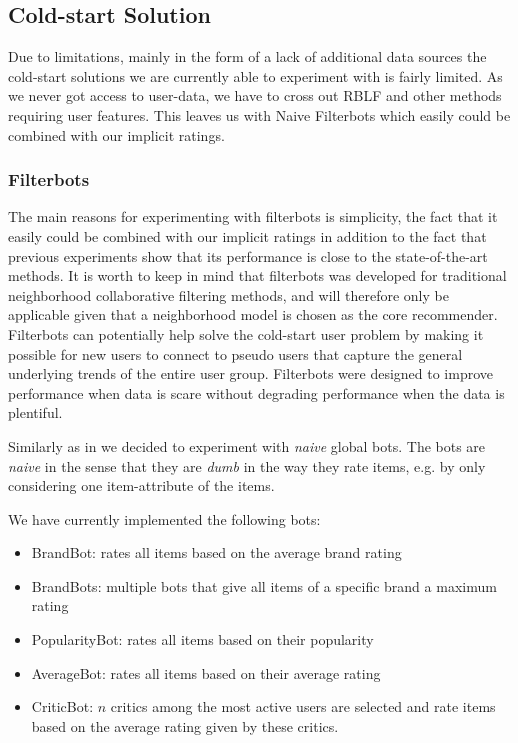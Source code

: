 \subsection{Cold-start Solution}

Due to limitations, mainly in the form of a lack of additional data sources the cold-start solutions
we are currently able to experiment with is fairly limited. As we never got access to
user-data, we have to cross out RBLF and other methods requiring user features. This leaves us with
Naive Filterbots \cite{Park2006} which easily could be combined with our implicit ratings.

\subsubsection{Filterbots}
\label{implementation-filterbots}

The main reasons for experimenting with filterbots is simplicity, the fact that it easily could
be combined with our implicit ratings in addition to the fact that previous experiments \cite{Agarwal2009, Agarwal2010}
show that its performance is close to the state-of-the-art methods. It is worth to keep in mind that filterbots was
developed for traditional neighborhood collaborative filtering methods, and will therefore only be applicable given
that a neighborhood model is chosen as the core recommender. Filterbots can potentially help solve the cold-start user
problem by making it possible for new users to connect to pseudo users that capture the general underlying trends of the entire
user group. Filterbots were designed to improve performance when data is scare without degrading performance when the data
is plentiful.

Similarly as in \cite{Park2006} we decided to experiment with \emph{naive} global bots. The bots are \emph{naive}
in the sense that they are \emph{dumb} in the way they rate items, e.g. by only considering one item-attribute of the items.

We have currently implemented the following bots:

\begin{itemize}
\item BrandBot: rates all items based on the average brand rating
\item BrandBots: multiple bots that give all items of a specific brand a maximum rating
\item PopularityBot: rates all items based on their popularity
\item AverageBot: rates all items based on their average rating
\item CriticBot: $n$ critics among the most active users are selected and rate items based on the average
	  rating given by these critics.
\end{itemize}

